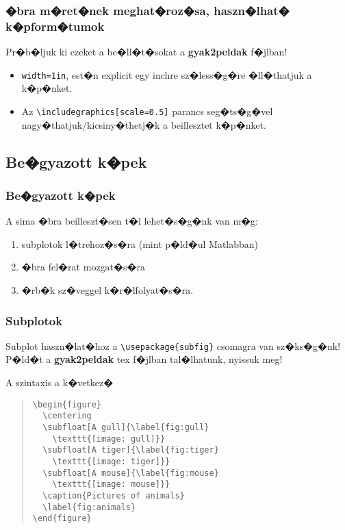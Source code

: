 \documentclass[xcolor=pdftex,dvipsnames,table,compress,bigger]{beamer}
\begin{document}
\begin{frame}[fragile]
	\frametitle{�bra m�ret�nek meghat�roz�sa, haszn�lhat� k�pform�tumok}
	\begin{block}{Pr�b�ljuk ki ezeket a be�ll�t�sokat a \textbf{gyak2peldak} f�jlban!}
	\begin{itemize}
	\item \verb*|width=1in|, est�n explicit egy inchre sz�less�g�re �ll�thatjuk a k�p�nket.
\item Az \verb*|\includegraphics[scale=0.5]|
    parancs seg�ts�g�vel nagy�thatjuk/kicsiny�thetj�k a beillesztet k�p�nket. 
    \end{itemize}
    \end{block}
\end{frame}

\subsection{Be�gyazott k�pek}
\begin{frame}
	\frametitle{Be�gyazott k�pek}
A sima �bra beilleszt�sen t�l lehet�s�g�nk van m�g:
	\begin{enumerate}
		\item subplotok l�trehoz�s�ra (mint p�ld�ul Matlabban)
		\item �bra fel�rat mozgat�s�ra
		\item �rb�k sz�veggel k�r�lfolyat�s�ra.
	\end{enumerate}
\end{frame}

\begin{frame}[fragile]
	\frametitle{Subplotok}
	Subplot haszn�lat�hoz a \verb*|\usepackage{subfig}| csomagra van sz�ks�g�nk!
	P�ld�t a \textbf{gyak2peldak} tex f�jlban tal�lhatunk, nyissuk meg!
	\begin{block}{A szintaxis a k�vetkez�}
		    \begin{quote}
		    {\footnotesize
    \begin{verbatim}
\begin{figure}
  \centering
  \subfloat[A gull]{\label{fig:gull}
  	\texttt{[image: gull]}}                
  \subfloat[A tiger]{\label{fig:tiger}
  	\texttt{[image: tiger]}}
  \subfloat[A mouse]{\label{fig:mouse}
  	\texttt{[image: mouse]}}
  \caption{Pictures of animals}
  \label{fig:animals}
\end{figure}
    \end{verbatim}}
    \end{quote}
	\end{block}
\end{frame}
\end{document}
